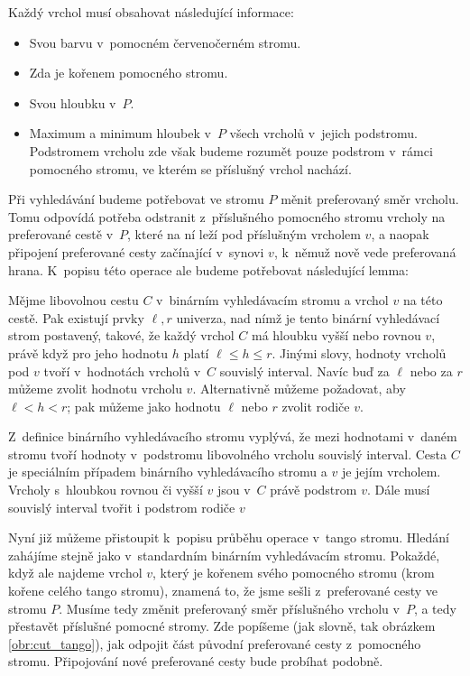 Každý vrchol musí obsahovat následující informace:
\begin{itemize}
\item Svou barvu v~pomocném červenočerném stromu.
\item Zda je kořenem pomocného stromu.
\item Svou hloubku v~$P$.
\item Maximum a minimum hloubek v~$P$ všech vrcholů v~jejich podstromu. Podstromem vrcholu zde však budeme rozumět pouze podstrom v~rámci pomocného stromu, ve kterém se příslušný vrchol nachází.
\end{itemize}

Při vyhledávání budeme potřebovat ve stromu $P$ měnit preferovaný směr
vrcholu. Tomu odpovídá potřeba odstranit z~příslušného pomocného stromu
vrcholy na preferované cestě v~$P$, které na ní leží pod příslušným vrcholem $v$, a naopak
připojení preferované cesty začínající v~synovi $v$, k~němuž nově vede
preferovaná hrana. K~popisu této operace ale budeme potřebovat následující
lemma:

\begin{lemma}\label{lemma:interval}
Mějme libovolnou cestu $C$ v~binárním vyhledávacím stromu a vrchol $v$ na této
cestě. Pak existují prvky $\ell, r$  univerza, nad nímž je tento binární
vyhledávací strom postavený, takové, že každý vrchol $C$ má hloubku vyšší nebo
rovnou $v$, právě když pro jeho hodnotu $h$ platí $\ell \leq h \leq r$. Jinými
slovy, hodnoty vrcholů pod $v$ tvoří v~hodnotách vrcholů v~$C$ souvislý
interval. Navíc buď za $\ell$ nebo za $r$ můžeme zvolit hodnotu vrcholu $v$.
Alternativně můžeme požadovat, aby $\ell < h < r$; pak můžeme jako hodnotu
$\ell$ nebo $r$ zvolit rodiče $v$.  \end{lemma}

\begin{dukaz}
Z~definice binárního vyhledávacího stromu vyplývá, že mezi hodnotami v~daném stromu tvoří hodnoty v~podstromu libovolného vrcholu souvislý interval. Cesta $C$ je speciálním případem binárního vyhledávacího stromu a $v$ je jejím vrcholem. Vrcholy s~hloubkou rovnou či vyšší $v$ jsou v~$C$ právě podstrom $v$. Dále musí souvislý interval tvořit i podstrom rodiče $v$ 
\end{dukaz}

Nyní již můžeme přistoupit k~popisu průběhu operace  v~tango stromu.
Hledání zahájíme stejně jako v~standardním binárním vyhledávacím stromu. Pokaždé,
když ale najdeme vrchol $v$, který je kořenem svého pomocného stromu (krom
kořene celého tango stromu), znamená to, že jsme sešli z~preferované cesty ve
stromu $P$. Musíme tedy změnit preferovaný směr příslušného vrcholu v~$P$, a
tedy přestavět příslušné pomocné stromy. Zde popíšeme (jak slovně, tak obrázkem \ref{obr:cut_tango}), jak odpojit část původní
preferované cesty z~pomocného stromu. Připojování nové preferované cesty bude
probíhat podobně.

